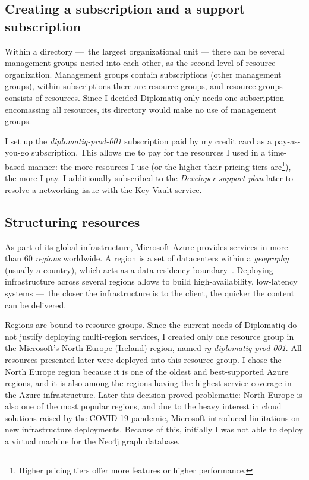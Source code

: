 \subsection{Creating a subscription and a support subscription}

Within a directory — the largest organizational unit — there can be several management groups nested into each other, as the second level of resource organization. Management groups contain subscriptions (other management groups), within subscriptions there are resource groups, and resource groups consists of resources. Since I decided Diplomatiq only needs one subscription encomassing all resources, its directory would make no use of management groups.

I set up the \emph{diplomatiq-prod-001} subscription paid by my credit card as a pay-as-you-go subscription. This allows me to pay for the resources I used in a time-based manner: the more resources I use (or the higher their pricing tiers are\footnote{Higher pricing tiers offer more features or higher performance.}), the more I pay. I additionally subscribed to the \emph{Developer support plan} later to resolve a networking issue with the Key Vault service.

\subsection{Structuring resources}

As part of its global infrastructure, Microsoft Azure provides services in more than 60 \emph{regions} worldwide. A region is a set of datacenters within a \emph{geography} (usually a country), which acts as a data residency boundary~\cite{azure-global-infrastructure}. Deploying infrastructure across several regions allows to build high-availability, low-latency systems — the closer the infrastructure is to the client, the quicker the content can be delivered.

Regions are bound to resource groups. Since the current needs of Diplomatiq do not justify deploying multi-region services, I created only one resource group in the Microsoft's North Europe (Ireland) region, named \emph{rg-diplomatiq-prod-001}. All resources presented later were deployed into this resource group. I chose the North Europe region because it is one of the oldest and best-supported Azure regions, and it is also among the regions having the highest service coverage in the Azure infrastructure. Later this decision proved problematic: North Europe is also one of the most popular regions, and due to the heavy interest in cloud solutions raised by the COVID-19 pandemic, Microsoft introduced limitations on new infrastructure deployments. Because of this, initially I was not able to deploy a virtual machine for the Neo4j graph database.

